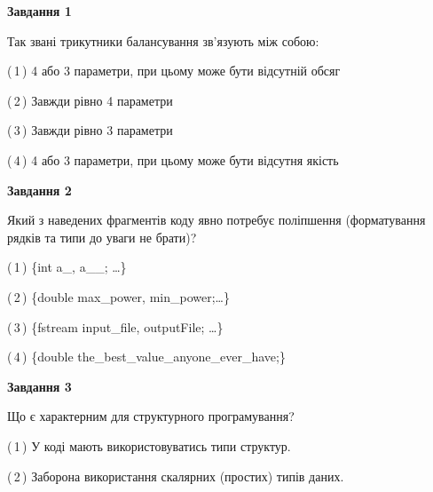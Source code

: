 \documentclass[10pt, ukrainian]{article}
\begin{document}
{
\begin {large}
{\begin {center}\textbf{Завдання 1}\end {center}}\par
Так звані трикутники балансування зв'язують між собою:\par
\vspace{2mm}



(\,1\,) 4 або 3 параметри, при цьому може бути відсутній обсяг %



(\,2\,) Завжди рівно 4 параметри%



(\,3\,) Завжди рівно 3 параметри%



(\,4\,) 4 або 3 параметри, при цьому може бути відсутня якість%


{\begin {center}\textbf{Завдання 2}\end {center}}\par
Який з наведених фрагментів коду явно потребує поліпшення (форматування рядків та типи до уваги не брати)?\par
\vspace{2mm}



(\,1\,) \{int a\_, a\_\_; …\}%



(\,2\,) \{double max\_power, min\_power;…\} %



(\,3\,) \{fstream input\_file, outputFile; …\}%



(\,4\,) \{double the\_best\_value\_anyone\_ever\_have;\} %


{\begin {center}\textbf{Завдання 3}\end {center}}\par
Що є характерним для структурного програмування?\par
\vspace{2mm}



(\,1\,) У коді мають використовуватись типи структур. %



(\,2\,) Заборона використання скалярних (простих) типів даних. %




\end{large}}
\end{document}
